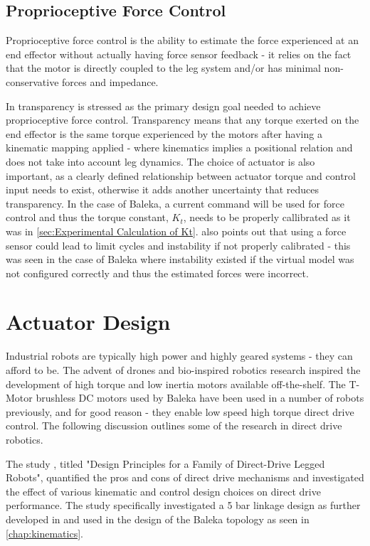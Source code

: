 \subsection{Proprioceptive Force Control}

Proprioceptive force control is the ability to estimate the force experienced at an end effector without actually having force sensor feedback - it relies on the fact that the motor is directly coupled to the leg system and/or has minimal non-conservative forces and impedance.\cite{Wang2012} 

In \cite{Wang2012} transparency is stressed as the primary design goal needed to achieve proprioceptive force control. Transparency means that any torque exerted on the end effector is the same torque experienced by the motors after having a kinematic mapping applied - where kinematics implies a positional relation and does not take into account leg dynamics.\cite{Wang2012} The choice of actuator is also important, as a clearly defined relationship between actuator torque and control input needs to exist, otherwise it adds another uncertainty that reduces transparency. In the case of Baleka, a current command will be used for force control and thus the torque constant, $K_t$, needs to be properly callibrated as it was in \cref{sec:Experimental Calculation of Kt}. \cite{Wang2012} also points out that using a force sensor could lead to limit cycles and instability if not properly calibrated - this was seen in the case of Baleka where instability existed if the virtual model was not configured correctly and thus the estimated forces were incorrect.

\section{Actuator Design}
\label{sec:Actuator Design}

Industrial robots are typically high power and highly geared systems - they can afford to be. The advent of drones and bio-inspired robotics research inspired the development of high torque and low inertia motors available off-the-shelf. The T-Motor brushless DC motors used by Baleka have been used in a number of robots previously, and for good reason - they enable low speed high torque direct drive control. The following discussion outlines some of the research in direct drive robotics.

The study \cite{Kenneally2016}, titled "Design Principles for a Family of Direct-Drive Legged Robots", quantified the pros and cons of direct drive mechanisms and investigated the effect of various kinematic and control design choices on direct drive performance.\cite{Kenneally2016} The study specifically investigated a 5 bar linkage design as further developed in \cite{Duperret} and used in the design of the Baleka topology as seen in \cref{chap:kinematics}.

